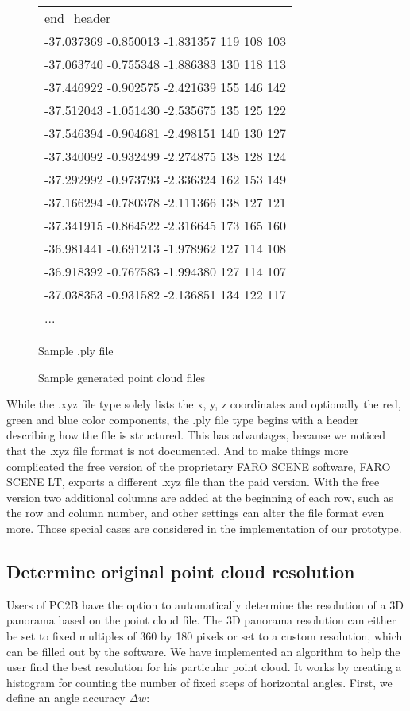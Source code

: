 \begin{figure}[h]
\begin{subtable}[b]{0.46\textwidth}
{\begin{tabular}{l}
			end\_header \\
			-37.037369 -0.850013 -1.831357 119 108 103 \\
			-37.063740 -0.755348 -1.886383 130 118 113 \\
			-37.446922 -0.902575 -2.421639 155 146 142 \\
			-37.512043 -1.051430 -2.535675 135 125 122 \\
			-37.546394 -0.904681 -2.498151 140 130 127 \\
			-37.340092 -0.932499 -2.274875 138 128 124 \\
			-37.292992 -0.973793 -2.336324 162 153 149 \\
			-37.166294 -0.780378 -2.111366 138 127 121 \\
			-37.341915 -0.864522 -2.316645 173 165 160 \\
			-36.981441 -0.691213 -1.978962 127 114 108 \\
			-36.918392 -0.767583 -1.994380 127 114 107 \\
			-37.038353 -0.931582 -2.136851 134 122 117 \\
			...
			
		\end{tabular}}
		\caption{Sample .ply file}
		\label{tab:ply_file}
	\end{subtable}
	\caption{Sample generated point cloud files}
	\label{fig:xyz_ply_file_structure}
\end{figure}

While the .xyz file type solely lists the x, y, z coordinates and optionally the red, green and blue color components, the .ply file type begins with a header describing how the file is structured. This has advantages, because we noticed that the .xyz file format is not documented. And to make things more complicated the free version of the proprietary FARO SCENE software, FARO SCENE LT, exports a different .xyz file than the paid version. With the free version two additional columns are added at the beginning of each row, such as the row and column number, and other settings can alter the file format even more. Those special cases are considered in the implementation of our prototype.


\subsection{Determine original point cloud resolution}

Users of PC2B have the option to automatically determine the resolution of a 3D panorama based on the point cloud file. The 3D panorama resolution can either be set to fixed multiples of 360 by 180 pixels or set to a custom resolution, which can be filled out by the software. We have implemented an algorithm to help the user find the best resolution for his particular point cloud. It works by creating a histogram for counting the number of fixed steps of horizontal angles. First, we define an angle accuracy $\Delta{w}$:

